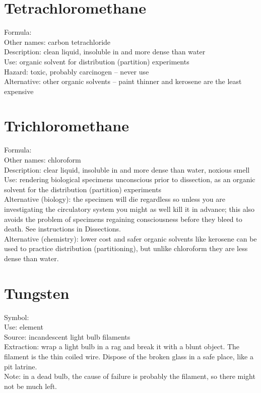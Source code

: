 \section{Tetrachloromethane}
\label{sec:tetrachloromethane}
Formula: \\
Other names: carbon tetrachloride\\
Description: clean liquid, 
insoluble in and more dense than water\\
Use: organic solvent for distribution (partition) experiments\\
Hazard: toxic, 
probably carcinogen -- never use\\
Alternative: other organic solvents -- 
paint thinner and kerosene are the least expensive

\section{Trichloromethane}
\label{sec:trichloromethane}
Formula: \\
Other names: chloroform\\
Description: clear liquid, 
insoluble in and more dense than water, 
noxious smell\\
Use: rendering biological specimens unconscious prior to dissection, 
as an organic solvent for the distribution (partition) experiments\\
Alternative (biology): the specimen will die regardless 
so unless you are investigating the circulatory system 
you might as well kill it in advance; 
this also avoids the problem of specimens regaining consciousness 
before they bleed to death. 
See instructions in Dissections.\\
Alternative (chemistry): lower cost and safer organic solvents like kerosene can be used to practice distribution (partitioning), 
but unlike chloroform they are less dense than water.

\section{Tungsten}
Symbol: \\
Use: element\\
Source: incandescent light bulb filaments\\
Extraction: wrap a light bulb in a rag and break it with a blunt object. 
The filament is the thin coiled wire. 
Dispose of the broken glass in a safe place, 
like a pit latrine.\\
Note: in a dead bulb, the cause of failure is probably the filament, 
so there might not be much left.

